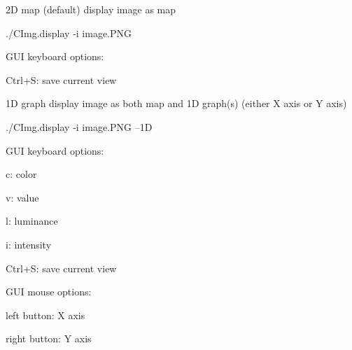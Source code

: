 \begin{DoxyParagraph}{2\-D map (default)}
display image as map 
\begin{DoxyCode}
   ./CImg.display -i image.PNG
\end{DoxyCode}
 G\-U\-I keyboard options\-: \begin{DoxyItemize}
\item {\ttfamily Ctrl+\-S}\-: save current view \end{DoxyItemize}

\end{DoxyParagraph}
\begin{DoxyParagraph}{1\-D graph}
display image as both map and 1\-D graph(s) (either X axis or Y axis) 
\begin{DoxyCode}
   ./CImg.display -i image.PNG --1D
\end{DoxyCode}
 G\-U\-I keyboard options\-: \begin{DoxyItemize}
\item {\ttfamily c\-:} color \item {\ttfamily v\-:} value \item {\ttfamily l\-:} luminance \item {\ttfamily i\-:} intensity \item {\ttfamily Ctrl+\-S}\-: save current view\end{DoxyItemize}
G\-U\-I mouse options\-: \begin{DoxyItemize}
\item {\ttfamily left} button\-: X axis \item {\ttfamily right} button\-: Y axis \end{DoxyItemize}

\end{DoxyParagraph}
